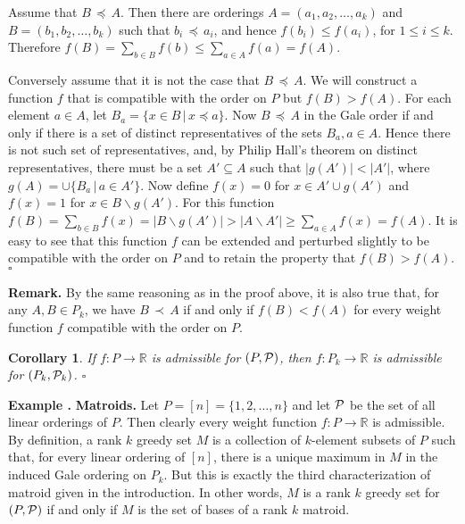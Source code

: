 \documentclass[12pt]{article}
\newcommand{\R}{{\mathbb R}}
\newcommand{\p}{{\preceq}}
\renewcommand{\P}{{\cal P}}
\newcommand{\proof}{\noindent{\em Proof: }}
\newcommand{\m}{\medskip}
\newcommand{\B}{\bigskip}
\newcommand{\qed}{\hspace{\fill}$\square$}
\renewcommand{\theequation}{\thesection.\arabic{equation}}
\newtheorem{cor}[equation]{Corollary}
\newenvironment{example}{\noindent\refstepcounter{equation}
{\bf Example \theequation}}{\m}
\begin{document}
\proof Assume that $B \,\p \, A$.  Then there are orderings $A = (
a_1, a_2, \dots, a_k )$ and $B = ( b_1, b_2, \dots, b_k )$ such that
$b_i \, \p \, a_i$, and hence $f(b_i) \leq f(a_i)$, for $1\leq i \leq
k$.  Therefore $f(B) = \sum_{b\in B} f(b) \leq \sum_{a\in A} f(a) =
f(A)$.

Conversely assume that it is not the case that $B \,\p \, A$.  We will
construct a function $f$ that is compatible with the order on $P$ but
$f(B) > f (A)$.  For each element $a \in A$, let $B_a = \{ x\in B
\, | \, x \p a \}$.  Now $B \,\p\, A$ in the Gale order if and only if
there is a set of distinct representatives of the sets $B_a, a \in A$.
Hence there is not such set of representatives, and, by Philip Hall's
theorem on distinct representatives, there must be a set $A' \subseteq
A$ such that $|g(A')| < |A'|$, where $g(A) = \cup \{B_a \, | \, a\in
A'\}$.  Now define $f(x) = 0$ for $x \in A' \cup g(A')$ and $f(x) = 1$
for $x \in B \smallsetminus g(A')$.  For this function $f(B) = \sum_{b\in B}
f(x) = |B \smallsetminus g(A')| > |A \smallsetminus A'| \geq
\sum_{a\in A} f(x) = f(A)$.  It is easy to see that this function $f$ can be
extended and perturbed slightly to be compatible with the order on $P$
and to retain the property that $f (B) > f(A)$.  \qed \m

{\bf Remark.} By the same reasoning as in the proof above, it is also
true that, for any $A,B \in P_k$, we have $B \,\prec \, A$ if and only
if $f (B) < f(A)$ for every weight function $f$ compatible with the
order on $P$.  \m

\begin{cor}  If $f: P \rightarrow \R$ is admissible for $(P, \P)$,
then $f: P_k \rightarrow \R$ is admissible for $(P_k, \P_k)$. \qed
\end{cor}
\B

\begin{example} \label{mat} {\bf Matroids.}   Let $P = [n] =
\{ 1, 2, \dots, n\}$ and let $\P$ be the set of all linear orderings
of $P$.  Then clearly every weight function $f : P \rightarrow \R$
is admissible.  By definition, a rank $k$ greedy set $M$ is a
collection of $k$-element subsets of $P$ such that, for every linear
ordering of $[n]$, there is a unique maximum in $M$ in the induced
Gale ordering on $P_k$.  But this is exactly the third
characterization of matroid given in the introduction.  In other
words, $M$ is a rank $k$ greedy set for $(P,\P)$ if and only if $M$ is
the set of bases of a rank $k$ matroid.
\end{example}
\B
\end{document}
